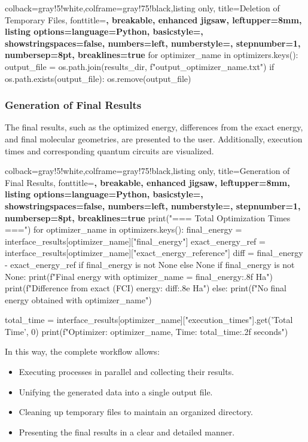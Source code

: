 \begin{tcblisting}{colback=gray!5!white,colframe=gray!75!black,listing only,
    title=Deletion of Temporary Files, fonttitle=\bfseries, breakable, enhanced jigsaw, leftupper=8mm,
    listing options={language=Python, basicstyle=\ttfamily\small,
    showstringspaces=false, numbers=left, numberstyle=\footnotesize,
    stepnumber=1, numbersep=8pt, breaklines=true}}
for optimizer_name in optimizers.keys():
    output_file = os.path.join(results_dir, f"output_{optimizer_name}.txt")
    if os.path.exists(output_file):
        os.remove(output_file)
\end{tcblisting}

\subsubsection{Generation of Final Results}
The final results, such as the optimized energy, differences from the exact energy, and final molecular geometries, are presented to the user. Additionally, execution times and corresponding quantum circuits are visualized.

\begin{tcblisting}{colback=gray!5!white,colframe=gray!75!black,listing only,
    title=Generation of Final Results, fonttitle=\bfseries, breakable, enhanced jigsaw, leftupper=8mm,
    listing options={language=Python, basicstyle=\ttfamily\small,
    showstringspaces=false, numbers=left, numberstyle=\footnotesize,
    stepnumber=1, numbersep=8pt, breaklines=true}}
print("=== Total Optimization Times ===\n")
for optimizer_name in optimizers.keys():
    final_energy = interface_results[optimizer_name]["final_energy"]
    exact_energy_ref = interface_results[optimizer_name]["exact_energy_reference"]
    diff = final_energy - exact_energy_ref if final_energy is not None else None
    if final_energy is not None:
        print(f"Final energy with {optimizer_name} = {final_energy:.8f} Ha")
        print(f"Difference from exact (FCI) energy: {diff:.8e} Ha\n")
    else:
        print(f"No final energy obtained with {optimizer_name}\n")

    total_time = interface_results[optimizer_name]["execution_times"].get('Total Time', 0)
    print(f"Optimizer: {optimizer_name}, Time: {total_time:.2f} seconds")
\end{tcblisting}

In this way, the complete workflow allows:
\begin{itemize}
    \item Executing processes in parallel and collecting their results.
    \item Unifying the generated data into a single output file.
    \item Cleaning up temporary files to maintain an organized directory.
    \item Presenting the final results in a clear and detailed manner.
\end{itemize}


